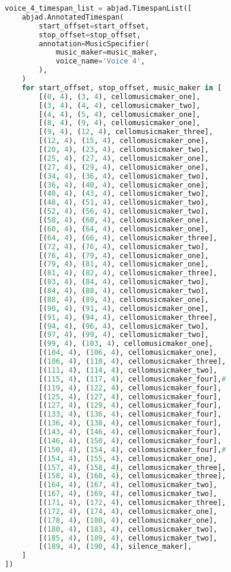 \begin{lstlisting}[language=Python, caption=Cthar Segment\_I]
voice_4_timespan_list = abjad.TimespanList([
    abjad.AnnotatedTimespan(
        start_offset=start_offset,
        stop_offset=stop_offset,
        annotation=MusicSpecifier(
            music_maker=music_maker,
            voice_name='Voice 4',
        ),
    )
    for start_offset, stop_offset, music_maker in [
        [(0, 4), (3, 4), cellomusicmaker_one],
        [(3, 4), (4, 4), cellomusicmaker_two],
        [(4, 4), (5, 4), cellomusicmaker_one],
        [(8, 4), (9, 4), cellomusicmaker_one],
        [(9, 4), (12, 4), cellomusicmaker_three],
        [(12, 4), (15, 4), cellomusicmaker_one],
        [(20, 4), (23, 4), cellomusicmaker_two],
        [(25, 4), (27, 4), cellomusicmaker_one],
        [(27, 4), (29, 4), cellomusicmaker_one],
        [(34, 4), (36, 4), cellomusicmaker_two],
        [(36, 4), (40, 4), cellomusicmaker_one],
        [(40, 4), (43, 4), cellomusicmaker_two],
        [(48, 4), (51, 4), cellomusicmaker_two],
        [(52, 4), (56, 4), cellomusicmaker_two],
        [(58, 4), (60, 4), cellomusicmaker_one],
        [(60, 4), (64, 4), cellomusicmaker_one],
        [(64, 4), (66, 4), cellomusicmaker_three],
        [(72, 4), (76, 4), cellomusicmaker_two],
        [(76, 4), (79, 4), cellomusicmaker_one],
        [(79, 4), (81, 4), cellomusicmaker_one],
        [(81, 4), (82, 4), cellomusicmaker_three],
        [(83, 4), (84, 4), cellomusicmaker_two],
        [(84, 4), (88, 4), cellomusicmaker_two],
        [(88, 4), (89, 4), cellomusicmaker_one],
        [(90, 4), (91, 4), cellomusicmaker_one],
        [(91, 4), (94, 4), cellomusicmaker_three],
        [(94, 4), (96, 4), cellomusicmaker_two],
        [(97, 4), (99, 4), cellomusicmaker_two],
        [(99, 4), (103, 4), cellomusicmaker_one],
        [(104, 4), (106, 4), cellomusicmaker_one],
        [(106, 4), (110, 4), cellomusicmaker_three],
        [(111, 4), (114, 4), cellomusicmaker_two],
        [(115, 4), (117, 4), cellomusicmaker_four],#
        [(119, 4), (122, 4), cellomusicmaker_four],
        [(125, 4), (127, 4), cellomusicmaker_four],
        [(127, 4), (129, 4), cellomusicmaker_four],
        [(133, 4), (136, 4), cellomusicmaker_four],
        [(136, 4), (138, 4), cellomusicmaker_four],
        [(143, 4), (146, 4), cellomusicmaker_four],
        [(146, 4), (150, 4), cellomusicmaker_four],
        [(150, 4), (154, 4), cellomusicmaker_four],#
        [(154, 4), (155, 4), cellomusicmaker_one],
        [(157, 4), (158, 4), cellomusicmaker_three],
        [(158, 4), (160, 4), cellomusicmaker_three],
        [(164, 4), (167, 4), cellomusicmaker_two],
        [(167, 4), (169, 4), cellomusicmaker_two],
        [(171, 4), (172, 4), cellomusicmaker_three],
        [(172, 4), (174, 4), cellomusicmaker_one],
        [(178, 4), (180, 4), cellomusicmaker_one],
        [(180, 4), (183, 4), cellomusicmaker_two],
        [(185, 4), (189, 4), cellomusicmaker_two],
        [(189, 4), (190, 4), silence_maker],
    ]
])


\end{lstlisting}
